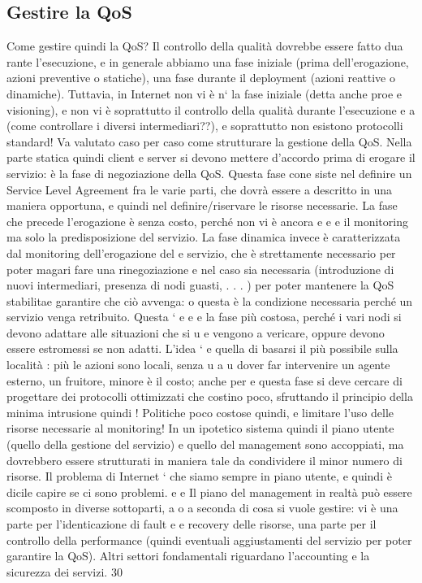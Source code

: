 \subsection{Gestire la QoS}
Come gestire quindi la QoS? Il controllo della qualità dovrebbe essere fatto dua
rante l'esecuzione, e in generale abbiamo una fase iniziale (prima dell'erogazione,
azioni preventive o statiche), una fase durante il deployment (azioni reattive o
dinamiche). Tuttavia, in Internet non vi è n` la fase iniziale (detta anche proe e
visioning), e non vi è soprattutto il controllo della qualità durante l'esecuzione
e
a
(come controllare i diversi intermediari??), e soprattutto non esistono protocolli
standard! Va valutato caso per caso come strutturare la gestione della QoS.
Nella parte statica quindi client e server si devono mettere d'accordo prima
di erogare il servizio: è la fase di negoziazione della QoS. Questa fase cone
siste nel definire un Service Level Agreement fra le varie parti, che dovrà essere
a
descritto in una maniera opportuna, e quindi nel definire/riservare le risorse necessarie. La fase che precede
l'erogazione è senza costo, perché non vi è ancora
e
e
e
il monitoring ma solo la predisposizione del servizio.
La fase dinamica invece è caratterizzata dal monitoring dell'erogazione del
e
servizio, che è strettamente necessario per poter magari fare una rinegoziazione
e
nel caso sia necessaria (introduzione di nuovi intermediari, presenza di nodi
guasti, . . . ) per poter mantenere la QoS stabilitae garantire che ciò avvenga:
o
questa è la condizione necessaria perché un servizio venga retribuito. Questa `
e
e
e
la fase più costosa, perché i vari nodi si devono adattare alle situazioni che si
u
e
vengono a vericare, oppure devono essere estromessi se non adatti. L'idea `
e
quella di basarsi il più possibile sulla località : più le azioni sono locali, senza
u
a
u
dover far intervenire un agente esterno, un fruitore, minore è il costo; anche per
e
questa fase si deve cercare di progettare dei protocolli ottimizzati che costino
poco, sfruttando il principio della minima intrusione quindi ! Politiche poco
costose quindi, e limitare l'uso delle risorse necessarie al monitoring! In un
ipotetico sistema quindi il piano utente (quello della gestione del servizio) e
quello del management sono accoppiati, ma dovrebbero essere strutturati in
maniera tale da condividere il minor numero di risorse. Il problema di Internet
` che siamo sempre in piano utente, e quindi è dicile capire se ci sono problemi.
e
e
Il piano del management in realtà può essere scomposto in diverse sottoparti,
a o
a seconda di cosa si vuole gestire: vi è una parte per l'identicazione di fault
e
e recovery delle risorse, una parte per il controllo della performance (quindi
eventuali aggiustamenti del servizio per poter garantire la QoS). Altri settori
fondamentali riguardano l'accounting e la sicurezza dei servizi.
30
